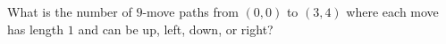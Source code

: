 What is the number of $9$-move paths from $(0, 0)$ to $(3, 4)$ where each move has length $1$ and can be up, left, down, or right?
